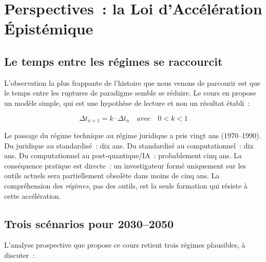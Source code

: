 \section{Perspectives~: la Loi d'Accélération Épistémique}

\subsection{Le temps entre les régimes se raccourcit}

L'observation la plus frappante de l'histoire que nous venons de parcourir
est que le temps entre les ruptures de paradigme semble se réduire.
Le cours en propose un modèle simple, qui est une hypothèse de lecture et
non un résultat établi~:

\begin{equation}
\Delta t_{n+1} = k \cdot \Delta t_n \quad \text{avec} \quad 0 < k < 1
\label{eq:acceleration}
\end{equation}

Le passage du régime technique au régime juridique a pris vingt ans (1970--1990).
Du juridique au standardisé~: dix ans. Du standardisé au computationnel~: dix
ans. Du computationnel au post-quantique/IA~: probablement cinq ans. La
conséquence pratique est directe~: un investigateur formé uniquement sur les
outils actuels sera partiellement obsolète dans moins de cinq ans. La
compréhension des \emph{régimes}, pas des outils, est la seule
formation qui résiste à cette accélération.

\subsection{Trois scénarios pour 2030--2050}

L'analyse prospective que propose ce cours retient trois régimes plausibles, à discuter~:

